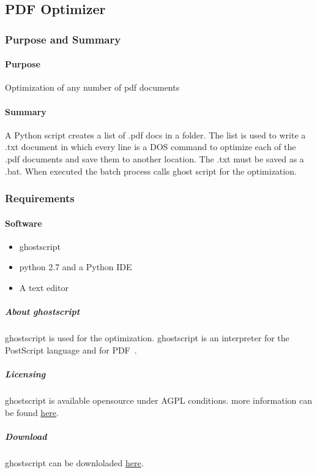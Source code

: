 %
%
%
%
% 
\subsection{PDF Optimizer}
\subsubsection{Purpose and Summary}

\paragraph{Purpose} Optimization of any number of pdf documents
%
\paragraph{Summary} A Python script creates a list of .pdf docs in a folder.  The list is used to write a .txt document in which every line is a DOS command to optimize each of the .pdf documents and save them to another location.  The .txt must be saved as a .bat.  When executed the batch process calls ghost script for the optimization.

\subsubsection{Requirements}
\paragraph{Software}
\begin{itemize}
\item ghostscript
\item python 2.7 and a Python IDE
\item A text editor
\end{itemize}


\subparagraph{About ghostscript}
ghostscript is used for the optimization. ghostscript is an interpreter for the PostScript language and for PDF~\cite{ghostscript1}.
\subparagraph*{Licensing}
ghostscript is available opensource under AGPL conditions.  more information can be found \href{https://www.ghostscript.com/license.html}{here}.
\subparagraph*{Download}
ghostscript can be downloladed \href{https://www.ghostscript.com/download/gsdnld.html}{here}.

